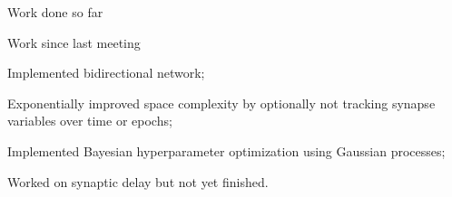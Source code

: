 \documentclass[t]{beamer}
\newcommand{\cmark}{\ding{51}}%
\newcommand{\done}{\rlap{$\square$}{\raisebox{2pt}{\large\hspace{1pt}\cmark}}%
\hspace{-2.5pt}}
\begin{document}
\begin{frame}{Work done so far}
\end{frame}


\begin{frame}{Work since last meeting}
	\begin{todolist}

    \item[\done] Implemented bidirectional network;
    \item[\done] Exponentially improved space complexity by optionally not tracking synapse variables over time or epochs;
    \item[\done] Implemented Bayesian hyperparameter optimization using Gaussian processes;
    \item Worked on synaptic delay but not yet finished.
  \end{todolist}

\end{frame}
\end{document}
